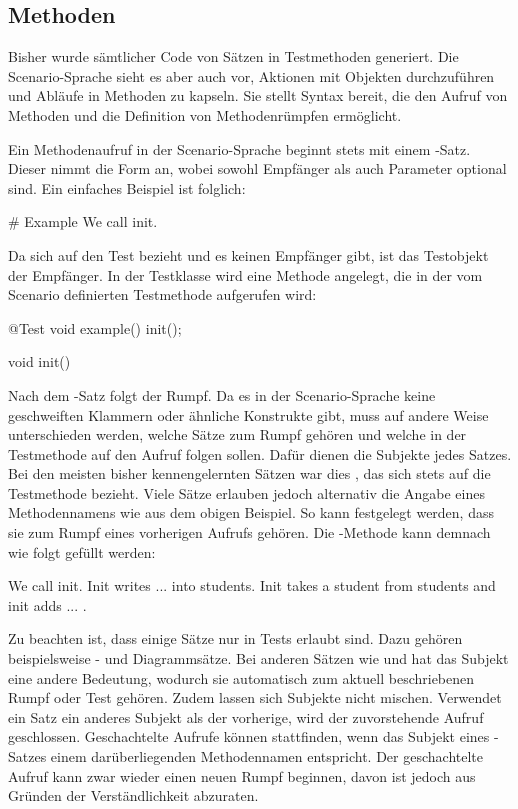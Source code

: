 \subsection{Methoden}\label{subsec:methods}

Bisher wurde sämtlicher Code von Sätzen in Testmethoden generiert.
Die Scenario-Sprache sieht es aber auch vor, Aktionen mit Objekten durchzuführen und Abläufe in Methoden zu kapseln.
Sie stellt Syntax bereit, die den Aufruf von Methoden und die Definition von Methodenrümpfen ermöglicht.

Ein Methodenaufruf in der Scenario-Sprache beginnt stets mit einem -Satz.
Dieser nimmt die Form  an, wobei sowohl Empfänger als auch Parameter optional sind.
Ein einfaches Beispiel ist folglich:

\begin{codeblock}
    # Example
    We call init.
\end{codeblock}

Da sich  auf den Test bezieht und es keinen Empfänger gibt, ist das Testobjekt der Empfänger.
In der Testklasse wird eine Methode  angelegt, die in der vom Scenario definierten Testmethode aufgerufen wird:

\begin{jcodeblock}
    @Test void example() {
        init();
    }

    void init() {
    }
\end{jcodeblock}

Nach dem -Satz folgt der Rumpf.
Da es in der Scenario-Sprache keine geschweiften Klammern oder ähnliche Konstrukte gibt, muss auf andere Weise unterschieden werden, welche Sätze zum Rumpf gehören und welche in der Testmethode auf den Aufruf folgen sollen.
Dafür dienen die Subjekte jedes Satzes.
Bei den meisten bisher kennengelernten Sätzen war dies , das sich stets auf die Testmethode bezieht.
Viele Sätze erlauben jedoch alternativ die Angabe eines Methodennamens wie  aus dem obigen Beispiel.
So kann festgelegt werden, dass sie zum Rumpf eines vorherigen Aufrufs gehören.
Die -Methode kann demnach wie folgt gefüllt werden:

\begin{codeblock}
    We call init.
    Init writes ... into students.
    Init takes a student from students and init adds ... .
\end{codeblock}

Zu beachten ist, dass einige Sätze nur in Tests erlaubt sind.
Dazu gehören beispielsweise - und Diagrammsätze.
Bei anderen Sätzen wie  und  hat das Subjekt eine andere Bedeutung, wodurch sie automatisch zum aktuell beschriebenen Rumpf oder Test gehören.
Zudem lassen sich Subjekte nicht mischen.
Verwendet ein Satz ein anderes Subjekt als der vorherige, wird der zuvorstehende Aufruf geschlossen.
Geschachtelte Aufrufe können stattfinden, wenn das Subjekt eines -Satzes einem darüberliegenden Methodennamen entspricht.
Der geschachtelte Aufruf kann zwar wieder einen neuen Rumpf beginnen, davon ist jedoch aus Gründen der Verständlichkeit abzuraten.


